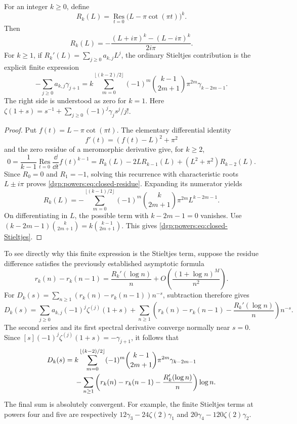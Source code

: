 \begin{lemma}
\label{dgp:powers:lem:closed-residue}
For an integer \(k\ge0\), define
\[
 R_k(L)=\operatorname*{Res}_{t=0}\bigl(L-\pi\cot(\pi t)\bigr)^k.
\]
Then
\begin{equation}
 \boxed{\displaystyle
 R_k(L)=-\frac{(L+i\pi)^k-(L-i\pi)^k}{2i\pi}.}
 \label{dgp:powers:eq:closed-residue}
\end{equation}
For \(k\ge1\), if \(R_k'(L)=\sum_{j\ge0}a_{k,j}L^j\), the
ordinary Stieltjes contribution is the explicit finite expression
\begin{equation}
 \boxed{\displaystyle
 -\sum_{j\ge0}a_{k,j}\gamma_{j+1}
 =k\sum_{m=0}^{\lfloor(k-2)/2\rfloor}
       (-1)^m\binom{k-1}{2m+1}\pi^{2m}\gamma_{k-2m-1}.}
 \label{dgp:powers:eq:closed-Stieltjes}
\end{equation}
The right side is understood as zero for \(k=1\). Here
\(\zeta(1+s)=s^{-1}+\sum_{j\ge0}(-1)^j\gamma_j s^j/j!\).
\end{lemma}

\begin{proof}
Put \(f(t)=L-\pi\cot(\pi t)\). The elementary differential
identity
\[
 f'(t)=(f(t)-L)^2+\pi^2
\]
and the zero residue of a meromorphic derivative give, for \(k\ge2\),
\[
 0=\frac1{k-1}\operatorname*{Res}_{t=0}\frac{\dd}{\dd t}f(t)^{k-1}
   =R_k(L)-2LR_{k-1}(L)+(L^2+\pi^2)R_{k-2}(L).
\]
Since \(R_0=0\) and \(R_1=-1\), solving this recurrence with
characteristic roots \(L\pm i\pi\) proves
\eqref{dgp:powers:eq:closed-residue}. Expanding its numerator yields
\[
 R_k(L)=-\sum_{m=0}^{\lfloor(k-1)/2\rfloor}
       (-1)^m\binom{k}{2m+1}\pi^{2m}L^{k-2m-1}.
\]
On differentiating in \(L\), the possible term with
\(k-2m-1=0\) vanishes. Use
\((k-2m-1)\binom{k}{2m+1}=k\binom{k-1}{2m+1}\).
This gives \eqref{dgp:powers:eq:closed-Stieltjes}.
\end{proof}

To see directly why this finite expression is the Stieltjes term,
suppose the residue difference satisfies the previously established
asymptotic formula
\[
 r_k(n)-r_k(n-1)
   =\frac{R_k'(\log n)}n
          +O\!\left(\frac{(1+\log n)^M}{n^2}\right).
\]
For \(D_k(s)=\sum_{n\ge1}(r_k(n)-r_k(n-1))n^{-s}\), subtraction
therefore gives
\[
 D_k(s)=\sum_{j\ge0}a_{k,j}(-1)^j\zeta^{(j)}(1+s)
 +\sum_{n\ge1}
   \left(r_k(n)-r_k(n-1)-\frac{R_k'(\log n)}n\right)n^{-s}.
\]
The second series and its first spectral derivative converge normally
near \(s=0\). Since
\([s](-1)^j\zeta^{(j)}(1+s)=-\gamma_{j+1}\), it follows that
\begin{align}
 [s]D_k(s)
 ={}&k\sum_{m=0}^{\lfloor(k-2)/2\rfloor}
       (-1)^m\binom{k-1}{2m+1}\pi^{2m}\gamma_{k-2m-1}
       \notag\\
 &-\sum_{n\ge1}
   \left(r_k(n)-r_k(n-1)-\frac{R_k'(\log n)}n\right)\log n.
 \label{dgp:powers:eq:closed-Dlinear}
\end{align}
The final sum is absolutely convergent. For example, the finite
Stieltjes terms at powers four and five are respectively
\(12\gamma_3-24\zeta(2)\gamma_1\) and
\(20\gamma_4-120\zeta(2)\gamma_2\).


